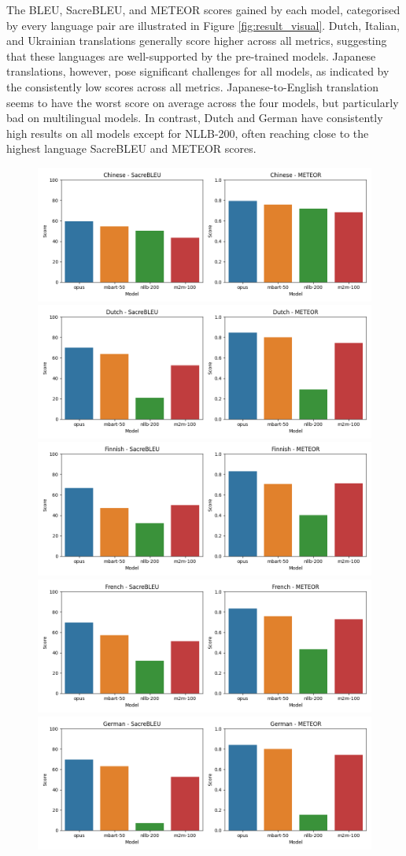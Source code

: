 \documentclass[a4paper, 11pt]{article}
\begin{document}
The BLEU, SacreBLEU, and METEOR scores gained by each model, categorised by every language pair are illustrated in Figure \ref{fig:result_visual}. Dutch, Italian, and Ukrainian translations generally score higher across all metrics, suggesting that these languages are well-supported by the pre-trained models. Japanese translations, however, pose significant challenges for all models, as indicated by the consistently low scores across all metrics. Japanese-to-English translation seems to have the worst score on average across the four models, but particularly bad on multilingual models. In contrast, Dutch and German have consistently high results on all models except for NLLB-200, often reaching close to the highest language SacreBLEU and METEOR scores.

\begin{figure}[htbp]
    \centering
    \includegraphics[width=0.49\linewidth]{figures/chinese_all_metrics.png}
    \includegraphics[width=0.49\linewidth]{figures/dutch_all_metrics.png}
    \includegraphics[width=0.49\linewidth]{figures/finnish_all_metrics.png}
    \includegraphics[width=0.49\linewidth]{figures/french_all_metrics.png}
    \includegraphics[width=0.49\linewidth]{figures/german_all_metrics.png}

\end{figure}
\end{document}
